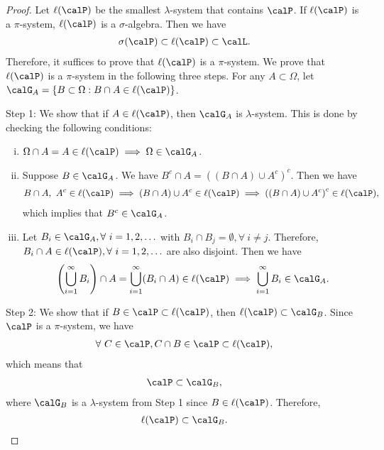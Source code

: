 \documentclass[../aipt.tex]{subfiles}
\begin{document}
\begin{proof}
Let $\ell(\calP)$ be the smallest $\lambda$-system that contains $\calP$. If $\ell(\calP)$ is a $\pi$-system, $\ell(\calP)$ is a $\sigma$-algebra. Then we have
\begin{align*}
\sigma(\calP) \subset \ell(\calP) \subset \calL.
\end{align*}
Therefore, it suffices to prove that $\ell(\calP)$ is a $\pi$-system. We prove that $\ell(\calP)$ is a $\pi$-system in the following three steps. For any $A \subset \Omega$, let $\calG_A = \{B \subset \Omega : B \cap A \in \ell(\calP) \}$.

Step 1:  We show that if $A \in \ell(\calP)$, then $\calG_A$ is $\lambda$-system. This is done by checking the following conditions:
\begin{enumerate}[(i)]
\item $\Omega \cap A = A \in \ell(\calP) \implies \Omega \in \calG_A$.
\item Suppose $B \in \calG_A$. We have $B^c \cap A = \left( \left(B \cap A \right) \cup {A^c} \right)^c$. Then we have
\begin{align*}
B \cap A,\ A^c \in  \ell(\calP) \implies \left(B \cap A \right) \cup {A^c} \in \ell(\calP) \implies \left( \left(B \cap A \right) \cup {A^c} \right)^c \in \ell(\calP),
\end{align*}
which implies that $B^c \in \calG_A$.
\item Let $B_i \in \calG_A, \forall\ i = 1, 2, \ldots$ with $B_i \cap B_j = \emptyset, \forall\ i \neq j$. Therefore, $B_i \cap A \in \ell(\calP), \forall\ i = 1, 2, \ldots$ are also disjoint. Then we have
\begin{align*}
\left(\bigcup\limits_{i=1}^{\infty} B_i\right) \cap A = \bigcup\limits_{i=1}^{\infty} (B_i \cap A ) \in \ell(\calP) \implies \bigcup\limits_{i=1}^{\infty} B_i \in \calG_A.
\end{align*}
\end{enumerate}

Step 2: We show that if $B \in \calP \subset \ell(\calP)$, then $\ell(\calP) \subset \calG_B$. Since $\calP$ is a $\pi$-system, we have
\begin{align*}
\forall\ C \in \calP, C \cap B \in \calP \subset \ell(\calP),
\end{align*}
which means that 
\begin{align*}
\calP \subset \calG_B,
\end{align*}
where $\calG_B$ is a $\lambda$-system from Step 1 since $B \in \ell(\calP)$. Therefore, 
\begin{align} \label{Thm:interm_result2}
\ell(\calP) \subset \calG_B. 
\end{align}


\end{proof}
\end{document}
